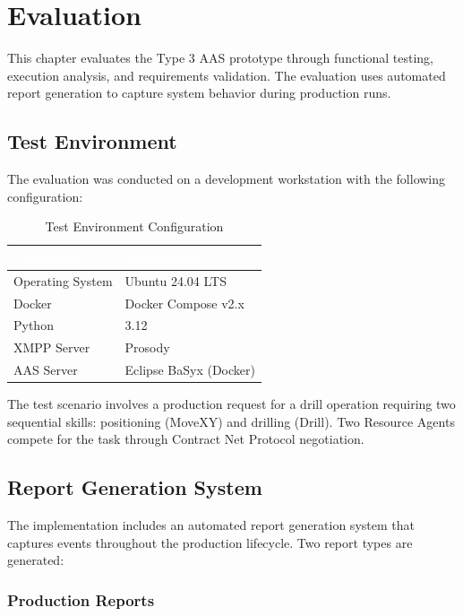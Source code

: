 \chapter{Evaluation}
\label{chap:evaluation}

This chapter evaluates the Type 3 \ac{AAS} prototype through functional testing, execution analysis, and requirements validation. The evaluation uses automated report generation to capture system behavior during production runs.

\section{Test Environment}
\label{sec:test_environment}

The evaluation was conducted on a development workstation with the following configuration:
\begin{table}[ht]
\centering
\caption{Test Environment Configuration}
\label{tab:test_env}
\begin{tabular}{ll}
\toprule
\rowcolor{headerblue}
\textcolor{white}{Component} & \textcolor{white}{Specification} \\
\midrule
Operating System & Ubuntu 24.04 LTS \\
Docker & Docker Compose v2.x \\
Python & 3.12 \\
XMPP Server & Prosody \\
AAS Server & Eclipse BaSyx (Docker) \\
\bottomrule
\end{tabular}
\end{table}
The test scenario involves a production request for a drill operation requiring two sequential skills: positioning (MoveXY) and drilling (Drill). Two Resource Agents compete for the task through Contract Net Protocol negotiation.

\section{Report Generation System}
\label{sec:report_system}

The implementation includes an automated report generation system that captures events throughout the production lifecycle. Two report types are generated:

\subsection{Production Reports}

